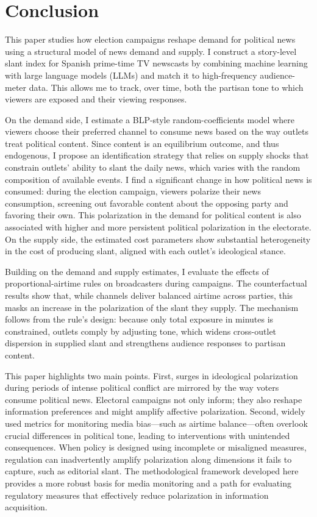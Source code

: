 \documentclass[12pt]{article}
\begin{document}
	
	
	
	\section{Conclusion}
	\label{sec:conclusion}
	
	
	This paper studies how election campaigns reshape demand for political news using a structural model of news demand and supply. I construct a story-level slant index for Spanish prime-time TV newscasts by combining machine learning with large language models (LLMs) and match it to high-frequency audience-meter data. This allows me to track, over time, both the partisan tone to which viewers are exposed and their viewing responses.
	
	
	
	
	
	On the demand side, I estimate a BLP-style random-coefficients model where viewers choose their preferred channel to consume news based on the way outlets treat political content. Since content is an equilibrium outcome, and thus endogenous, I propose an identification strategy that relies on supply shocks that constrain outlets’ ability to slant the daily news, which varies with the random composition of available events. I find a significant change in how political news is consumed: during the election campaign, viewers polarize their news consumption, screening out favorable content about the opposing party and favoring their own. This polarization in the demand for political content is also associated with higher and more persistent political polarization in the electorate. On the supply side, the estimated cost parameters show substantial heterogeneity in the cost of producing slant, aligned with each outlet’s ideological stance.
	
	
	
	Building on the demand and supply estimates, I evaluate the effects of  proportional-airtime rules on broadcasters during campaigns. The counterfactual results show that, while channels deliver balanced airtime across parties, this masks an increase in the polarization of the slant they supply. The mechanism follows from the rule’s design: because only total exposure in minutes is constrained, outlets comply by adjusting tone, which widens cross-outlet dispersion in supplied slant and strengthens audience responses to partisan content.
	
	This paper highlights two main points. First, surges in ideological polarization during periods of intense political conflict are mirrored by the way voters consume political news. Electoral campaigns not only inform; they also reshape information preferences and might amplify affective polarization. Second, widely used metrics for monitoring media bias—such as airtime balance—often overlook crucial differences in political tone, leading to interventions with unintended consequences. When policy is designed using incomplete or misaligned measures, regulation can inadvertently amplify polarization along dimensions it fails to capture, such as editorial slant. The methodological framework developed here provides a more robust basis for media monitoring and a path for evaluating regulatory measures that effectively reduce polarization in information acquisition.
	
\end{document}
